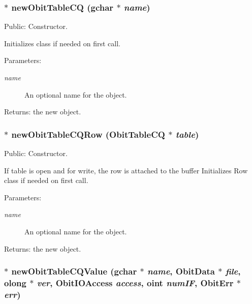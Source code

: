 \subsubsection{$\ast$ new\-Obit\-Table\-CQ (gchar $\ast$ {\em name})}\label{ObitTableCQ_8c_a16}


Public: Constructor. 

Initializes class if needed on first call. \begin{Desc}
\item[Parameters:]
\begin{description}
\item[{\em name}]An optional name for the object. \end{description}
\end{Desc}
\begin{Desc}
\item[Returns:]the new object. \end{Desc}
\subsubsection{$\ast$ new\-Obit\-Table\-CQRow ({\bf Obit\-Table\-CQ} $\ast$ {\em table})}\label{ObitTableCQ_8c_a14}


Public: Constructor. 

If table is open and for write, the row is attached to the buffer Initializes Row class if needed on first call. \begin{Desc}
\item[Parameters:]
\begin{description}
\item[{\em name}]An optional name for the object. \end{description}
\end{Desc}
\begin{Desc}
\item[Returns:]the new object. \end{Desc}
\subsubsection{$\ast$ new\-Obit\-Table\-CQValue (gchar $\ast$ {\em name}, {\bf Obit\-Data} $\ast$ {\em file}, {\bf olong} $\ast$ {\em ver}, Obit\-IOAccess {\em access}, {\bf oint} {\em num\-IF}, {\bf Obit\-Err} $\ast$ {\em err})}\label{ObitTableCQ_8c_a18}


